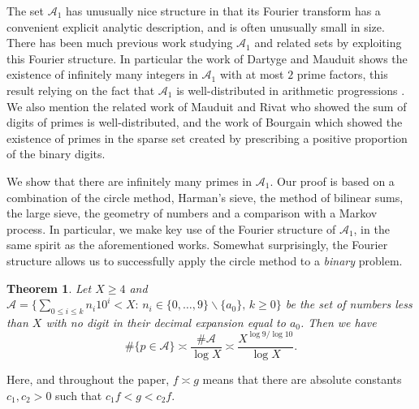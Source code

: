 \documentclass[10pt]{amsart}
\theoremstyle{plain}
\newtheorem{thrm}{Theorem}[section]
\numberwithin{sblmm}{thrm}
\numberwithin{equation}{section}
\begin{document}
The set $\mathcal{A}_1$ has unusually nice structure in that its Fourier transform has a convenient explicit analytic description, and is often unusually small in size. There has been much previous work \cite{1,2,3,4,5,6,7} studying $\mathcal{A}_1$ and related sets by exploiting this Fourier structure. In particular the work of Dartyge and Mauduit \cite{Almost1,Almost2} shows the existence of infinitely many integers in $\mathcal{A}_1$ with at most $2$ prime factors, this result relying on the fact that $\mathcal{A}_1$ is well-distributed in arithmetic progressions \cite{Almost1,Level1,Level2}. We also mention the related work of Mauduit and Rivat \cite{MauduitRivat} who showed the sum of digits of primes is well-distributed, and the work of Bourgain \cite{Bourgain} which showed the existence of primes in the sparse set created by prescribing a positive proportion of the binary digits.

We show that there are infinitely many primes in $\mathcal{A}_1$. Our proof is based on a combination of the circle method, Harman's sieve, the method of bilinear sums, the large sieve, the geometry of numbers and a comparison with a Markov process. In particular, we make key use of the Fourier structure of $\mathcal{A}_1$, in the same spirit as the aforementioned works. Somewhat surprisingly, the Fourier structure allows us to successfully apply the circle method to a \textit{binary} problem.
%
%
%
%
\begin{thrm}\label{thrm:MainTheorem}
%
Let $X\ge 4$ and $\mathcal{A}=\{\sum_{0\le i\le k}n_i10^i< X:\, n_i\in\{0,\dots,9\}\backslash\{a_0\},\,k\ge 0\}$ be the set of numbers less than $X$ with no digit  in their decimal expansion equal to $a_0$. Then we have
\[
\#\{p\in\mathcal{A}\}\asymp \frac{\#\mathcal{A}}{\log{X}}\asymp \frac{X^{\log{9}/\log{10}}}{\log{X}}.
\]
%
\end{thrm}
%
%
%
%
Here, and throughout the paper, $f\asymp g$ means that there are absolute constants $c_1,c_2>0$ such that $c_1f<g<c_2f$.
\end{document}
